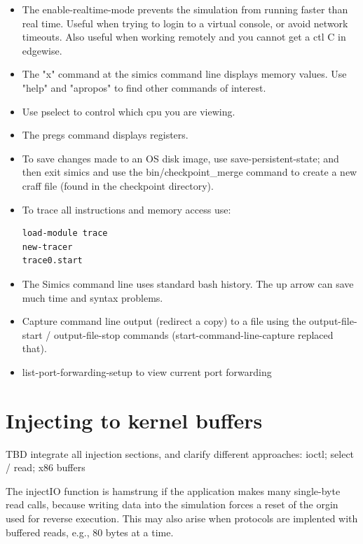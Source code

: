 \documentclass[titlepage]{article}
\begin{document}
\begin{appendices}
\begin{itemize}
\item The enable-realtime-mode prevents the simulation from running faster than real time.  Useful when trying to login
to a virtual console, or avoid network timeouts.  Also useful when working remotely and you cannot get a ctl C in 
edgewise.

\item The "x" command at the simics command line displays memory values.  Use "help" and "apropos" to find other commands of interest.

\item Use pselect to control which cpu you are viewing.

\item The pregs command displays registers.  

\item To save changes made to an OS disk image, use save-persistent-state; and then exit simics and use the bin/checkpoint\_merge command
to create a new craff file (found in the checkpoint directory).

\item To trace all instructions and memory access use:
\begin{verbatim}
load-module trace
new-tracer
trace0.start
\end{verbatim}

\item The Simics command line uses standard bash history.  The up arrow can save much time and syntax problems.

\item Capture command line output (redirect a copy) to a file using the output-file-start / output-file-stop commands
(start-command-line-capture replaced that).

\item {list-port-forwarding-setup} to view current port forwarding
\end{itemize}

\section{Injecting to kernel buffers}
TBD integrate all injection sections, and clarify different approaches: ioctl; select / read; x86 buffers


The injectIO function is hamstrung if the application makes many single-byte read calls, because writing data into the
simulation forces a reset of the orgin used for reverse execution.  This may also arise when protocols are implented
with buffered reads, e.g., 80 bytes at a time.


\end{appendices}
\end{document}
